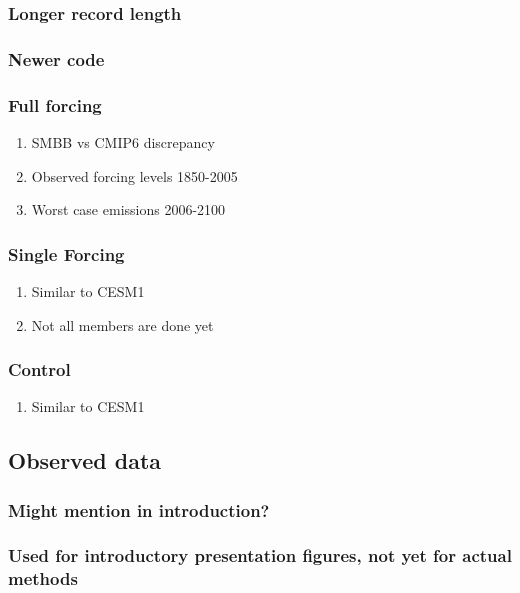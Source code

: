 \documentclass[11pt]{article}
\begin{document}
\subsubsection{Longer record length}
\label{sec:org6ef82de}
\subsubsection{Newer code}
\label{sec:org1bfcb6e}
\subsubsection{Full forcing}
\label{sec:orgad33236}
\begin{enumerate}
\item SMBB vs CMIP6 discrepancy
\label{sec:org7c1e55b}
\item Observed forcing levels 1850-2005
\label{sec:org82d9b1c}
\item Worst case emissions 2006-2100
\label{sec:org849b535}
\end{enumerate}
\subsubsection{Single Forcing}
\label{sec:org373f00c}
\begin{enumerate}
\item Similar to CESM1
\label{sec:org690c5d6}
\item Not all members are done yet
\label{sec:org8ea3d2f}
\end{enumerate}
\subsubsection{Control}
\label{sec:orgb301cb6}
\begin{enumerate}
\item Similar to CESM1
\label{sec:org735b3e3}
\end{enumerate}
\subsection{Observed data}
\label{sec:orgeb1c1df}
\subsubsection{Might mention in introduction?}
\label{sec:orga6c7ed4}
\subsubsection{Used for introductory presentation figures, not yet for actual methods}
\label{sec:org9778c23}
\end{document}
